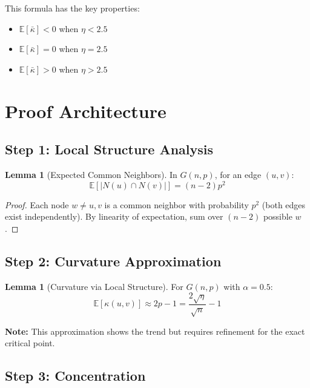 \documentclass[11pt,a4paper]{article}
\theoremstyle{definition}
\newtheorem{lemma}[theorem]{Lemma}
\begin{document}
This formula has the key properties:
\begin{itemize}
    \item $\mathbb{E}[\bar{\kappa}] < 0$ when $\eta < 2.5$
    \item $\mathbb{E}[\bar{\kappa}] = 0$ when $\eta = 2.5$
    \item $\mathbb{E}[\bar{\kappa}] > 0$ when $\eta > 2.5$
\end{itemize}

\section{Proof Architecture}

\subsection{Step 1: Local Structure Analysis}

\begin{lemma}[Expected Common Neighbors]
In $G(n, p)$, for an edge $(u, v)$:
\begin{equation}
\mathbb{E}[|N(u) \cap N(v)|] = (n-2)p^2
\end{equation}
\end{lemma}

\begin{proof}
Each node $w \neq u, v$ is a common neighbor with probability $p^2$ (both edges exist independently). By linearity of expectation, sum over $(n-2)$ possible $w$.
\end{proof}

\subsection{Step 2: Curvature Approximation}

\begin{lemma}[Curvature via Local Structure]
For $G(n, p)$ with $\alpha = 0.5$:
\begin{equation}
\mathbb{E}[\kappa(u,v)] \approx 2p - 1 = \frac{2\sqrt{\eta}}{\sqrt{n}} - 1
\end{equation}
\end{lemma}

\textbf{Note:} This approximation shows the trend but requires refinement for the exact critical point.

\subsection{Step 3: Concentration}
\end{document}
